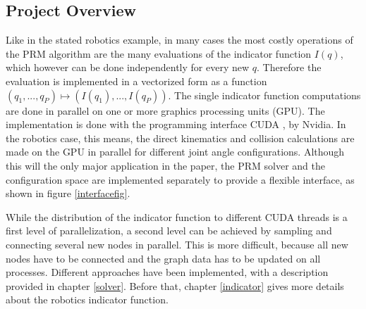\documentclass[twocolumn]{svjour3}
\begin{document}
\subsection{Project Overview}

Like in the stated robotics example, in many cases the most costly operations of the PRM algorithm are the many evaluations of the indicator function \(I(q)\), 
which however can be done independently for every new \(q\).
Therefore the evaluation is implemented in a vectorized form as a function \((q_1, ... , q_P) \mapsto (I(q_1),...,I(q_P))\). 
The single indicator function computations are done in parallel on one or more graphics processing units (GPU).
The implementation is done with the programming interface CUDA \cite{cuda}, \cite{cuda2} by Nvidia.
In the robotics case, this means, the direct kinematics and collision calculations are made on the GPU in parallel for different joint angle configurations.
Although this will the only major application in the paper, the PRM solver and the configuration space are implemented separately to provide a flexible interface, as shown in figure \ref{interfacefig}. 

While the distribution of the indicator function to different CUDA threads is a first level of parallelization, 
a second level can be achieved by sampling and connecting several new nodes in parallel. 
This is more difficult, because all new nodes have to be connected 
and the graph data has to be updated on all processes. 
Different approaches have been implemented, with a description provided in chapter \ref{solver}.
Before that, chapter \ref{indicator} gives more details about the robotics indicator function.
\end{document}
